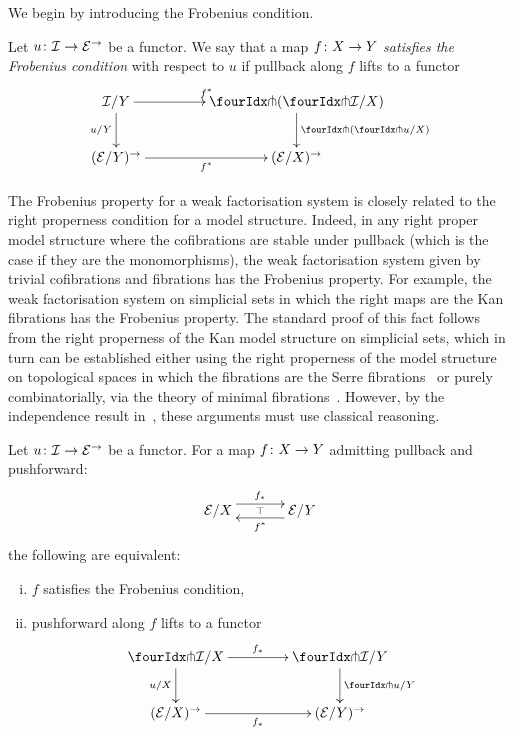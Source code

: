 \documentclass[reqno,10pt,a4paper,oneside,draft]{amsart}
\begin{document}
\medskip

We begin by introducing the Frobenius condition.

\begin{definition}
Let $u \colon \mathcal{I} \to \mathcal{E}^\to$ be a functor.
We say that a map $f \colon X \to Y$ \emph{satisfies the Frobenius condition} with respect to $u$ if pullback along $f$ lifts to a functor
\[
\xymatrix@C=1.5cm{
  \cal{I}/Y
  \ar[r]^{f^*}
  \ar[d]_{u/Y}
&
  \liftl{ ( \liftr{\cal{I}}/X ) }
  \ar[d]^{\liftl{(\liftr{u}/X)}}
\\
  (\catE/Y)^\to \ar[r]_{f^*}
&
  (\catE/X)^\to
}
\]
\end{definition}

The Frobenius property for a weak factorisation system is closely related to the right properness condition for a model structure.
Indeed, in any right proper model structure where the cofibrations are stable under pullback (which is the case if they are the monomorphisms), the weak factorisation system given by trivial cofibrations and fibrations has the Frobenius property.
For example, the weak factorisation system on simplicial sets in which the right maps are the Kan fibrations has the Frobenius property.
The standard proof of this fact follows from the right properness of the Kan model structure on simplicial sets, which in turn can be established either using the right properness of the model structure on topological spaces in which  the fibrations are the Serre fibrations~\cite[Theorem~13.1.13]{hirschhorn-model-localizations} or purely combinatorially, via the theory of minimal fibrations~\cite[Theorem~1.7.1]{joyal-tierney-notes}.
However, by the independence result in~\cite{coquand-non-constructivity-kan}, these arguments must use classical reasoning.

\begin{proposition} \label{lift-dependent-product}
Let $u \colon \mathcal{I} \to \mathcal{E}^\to$ be a functor.
For a map $f \colon X \to Y$ admitting pullback and pushforward:
\[
\xymatrix@C+1em{
  \catE/X
  \ar@<5pt>[r]^{f_*}
  \ar@{}[r]|{\top}
&
  \catE/Y
  \ar@<5pt>[l]^{f^*}
}
\]
the following are equivalent:
\begin{enumerate}[(i)]
\item $f$ satisfies the Frobenius condition,
\item pushforward along $f$ lifts to a functor
\[
\xymatrix@C=1.5cm{
  \liftr{\cal{I}}/X
  \ar[r]^{f_*}
  \ar[d]_{u/X}
&
  \liftr{\cal{I}}/Y
  \ar[d]^{\liftr{u}/Y}
\\
  (\catE/X)^\to
  \ar[r]_{f_*}
&
  (\catE/Y)^\to
}
\]

\end{enumerate}
\end{proposition}
\end{document}
